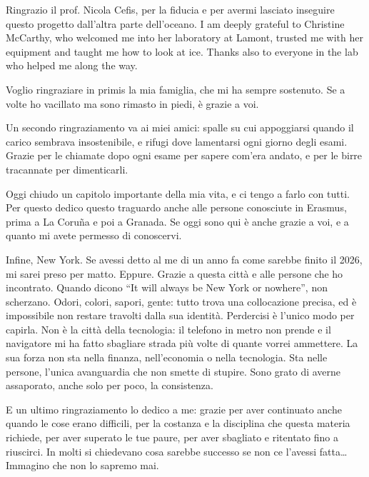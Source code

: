 \documentclass{Configuration_Files/PoliMi3i_thesis}
\begin{document}
Ringrazio il prof. Nicola Cefis, per la fiducia e per avermi lasciato inseguire questo progetto dall’altra parte dell’oceano. I am deeply grateful to Christine McCarthy, who welcomed me into her laboratory at Lamont, trusted me with her equipment and taught me how to look at ice. Thanks also to everyone in the lab who helped me along the way.

Voglio ringraziare in primis la mia famiglia, che mi ha sempre sostenuto. Se a volte ho vacillato ma sono rimasto in piedi, è grazie a voi.

Un secondo ringraziamento va ai miei amici: spalle su cui appoggiarsi quando il carico sembrava insostenibile, e rifugi dove lamentarsi ogni giorno degli esami. Grazie per le chiamate dopo ogni esame per sapere com’era andato, e per le birre tracannate per dimenticarli.

Oggi chiudo un capitolo importante della mia vita, e ci tengo a farlo con tutti. Per questo dedico questo traguardo anche alle persone conosciute in Erasmus, prima a La Coruña e poi a Granada. Se oggi sono qui è anche grazie a voi, e a quanto mi avete permesso di conoscervi.

Infine, New York. Se avessi detto al me di un anno fa come sarebbe finito il 2026, mi sarei preso per matto. Eppure. Grazie a questa città e alle persone che ho incontrato. Quando dicono “It will always be New York or nowhere”, non scherzano. Odori, colori, sapori, gente: tutto trova una collocazione precisa, ed è impossibile non restare travolti dalla sua identità. Perdercisi è l’unico modo per capirla. Non è la città della tecnologia: il telefono in metro non prende e il navigatore mi ha fatto sbagliare strada più volte di quante vorrei ammettere. La sua forza non sta nella finanza, nell’economia o nella tecnologia. Sta nelle persone, l’unica avanguardia che non smette di stupire. Sono grato di averne assaporato, anche solo per poco, la consistenza.

E un ultimo ringraziamento lo dedico a me: grazie per aver continuato anche quando le cose erano difficili, per la costanza e la disciplina che questa materia richiede, per aver superato le tue paure, per aver sbagliato e ritentato fino a riuscirci. In molti si chiedevano cosa sarebbe successo se non ce l’avessi fatta… Immagino che non lo sapremo mai.

\cleardoublepage
\end{document}
